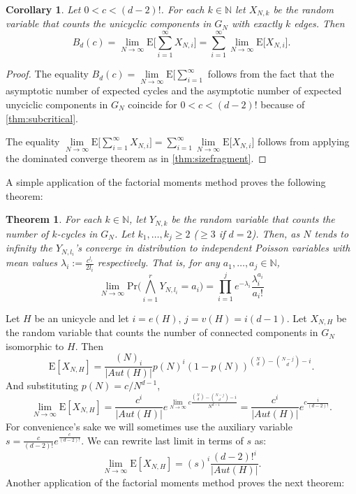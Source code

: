 \documentclass[11pt,notitlepage,a4paper]{article}
\newtheorem{theorem}{Theorem}[section]
\newtheorem{corollary}{Corollary}[section]
\theoremstyle{definition}
\newcommand{\N}{\mathbb{N}}
\newcommand{\LN}{\lim\limits_{N\to \infty}}
\begin{document}
	\begin{corollary} \label{thm:limitchangeunicycles}
		Let $0<c<(d-2)!$. For each $k\in \N$ let 
		$X_{N,k}$ be the random variable that counts the
		unicyclic components in $G_N$ with exactly $k$ edges. 
		Then 
		\[
	 	B_d(c)=\LN \mathrm{E}\big[\sum_{i=1}^\infty X_{N,i} \big]	
		= \sum_{i=1}^\infty \LN \mathrm{E}\big[ X_{N,i} \big].
		\]
	\end{corollary}
	\begin{proof}
	The equality $B_d(c)=\LN \mathrm{E}\big[\sum_{i=1}^\infty$ follows from the
	fact that the asymptotic
	number of expected cycles and the asymptotic number
	of expected unyciclic components in $G_N$ coincide
	for $0<c<(d-2)!$ because of \cref{thm:subcritical}.\par
	The equality $\LN \mathrm{E}\big[\sum_{i=1}^\infty X_{N,i} \big]	
	= \sum_{i=1}^\infty \LN \mathrm{E}\big[ X_{N,i} \big]$
	follows from applying the dominated converge theorem as in 
	\cref{thm:sizefragment}.
	\end{proof}
	A simple application of the factorial moments method proves the following
	theorem:
	\begin{theorem} \label{thm:probcycles} 
		For each $k\in \N$, let $Y_{N,k}$ be the random variable
		that counts the number of $k$-cycles in $G_N$.
		Let $k_1,\dots,k_j\geq 2$ ($\geq 3$ if $d=2$). Then, 
		as $N$ tends to infinity the $Y_{N,l_i}$'s converge 
		in distribution to independent Poisson variables
		with mean values $\lambda_i:=\frac{c^{l_i}}{2l_i}$ respectively.
		That is, for any $a_1,\dots,a_j\in \N$,
		\[
		\LN \mathrm{Pr}\Big(
		\bigwedge_{i=1}^r
		Y_{N,l_i}=a_i		
		\Big)= \prod_{i=1}^{j} e^{-\lambda_i}\frac{\lambda_i^{a_i}}{a_i!}
		\]
	\end{theorem}
	
	
	Let $H$ be an unicycle and let $i=e(H)$, $j=v(H)=i(d-1)$. 
	Let $X_{N,H}$ be the random variable that counts
	the number of connected components in $G_N$ isomorphic to $H$. Then
	\[ 
	\mathrm{E}[X_{N,H}]= \frac{(N)_i}{|Aut(H)|}
	p(N)^{i}(1-p(N))^{\binom{N}{d}-\binom{N-j}{d} - i}.
	\]
	And substituting $p(N)=c/N^{d-1}$,
	\[
	\LN \mathrm{E}[X_{N,H}]=  \frac{c^i}{|Aut(H)|}
	e^{\LN c\frac{\binom{N}{d}-\binom{N-j}{d} - i}{N^{d-1}}}
	=  \frac{c^i}{|Aut(H)|}
	e^{c\frac{i}{(d-2)!}}.
	\]	
	For convenience's sake we will sometimes use the auxiliary variable
	$s=\frac{c}{(d-2)!}e^{\frac{c}{(d-2)!}}$. We can rewrite last 
	limit in terms of $s$ as:
	\[
	\LN \mathrm{E}[X_{N,H}]=(s)^i
	\frac{(d-2)!^i}{|Aut(H)|}.	
	\]
	Another application of the factorial moments method proves the next theorem:
\end{document}
